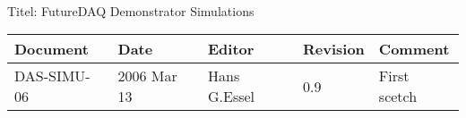 \\Titel: FutureDAQ Demonstrator Simulations
\begin{table}[h]
\begin{tabular}{|p{2.8cm}|p{2.0cm}|p{3.0cm}|p{1.6cm}|p{5.0cm}|} \hline
Document   & Date        & Editor       & Revision & Comment \\ \hline
DAS-SIMU-06 & 2006 Mar 13 & Hans G.Essel & 0.9      & First scetch \\ \hline
\end{tabular}
\end{table}
